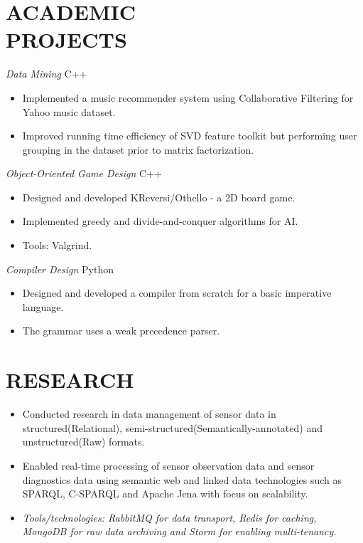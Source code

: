 \documentclass[line,margin]{res}
\begin{document}
\begin{resume}
 
\section{ACADEMIC \\ PROJECTS}  {\sl Data Mining} \hfill        C++
                 \begin{itemize}  \itemsep -2pt %
                 \item Implemented a music recommender system using Collaborative Filtering for Yahoo music dataset.
                 \item Improved running time efficiency of SVD feature toolkit but performing user grouping in the dataset prior to matrix factorization.
                 \end{itemize} 
                {\sl Object-Oriented Game Design}  \hfill        C++
                  \begin{itemize} \itemsep -2pt
                   \item Designed and developed KReversi/Othello - a 2D board game.
                   \item Implemented greedy and divide-and-conquer algorithms for AI.
                   \item Tools: Valgrind.
                   \end{itemize} 
                   {\sl Compiler Design}  \hfill        Python
                  \begin{itemize} \itemsep -2pt
                   \item Designed and developed a compiler from scratch for a basic imperative language.
                   \item The grammar uses a weak precedence parser.       
                   \end{itemize}
                   
\section{RESEARCH}	\begin{itemize}  \itemsep -2pt
					\item Conducted research in data management of sensor data in structured(Relational), semi-structured(Semantically-annotated) and unstructured(Raw) formats. 
					\item Enabled real-time processing of sensor observation data and sensor diagnostics data using semantic web and linked data technologies such as SPARQL, C-SPARQL and Apache Jena with focus on scalability.
					\item \emph{Tools/technologies: RabbitMQ for data transport, Redis for caching, MongoDB for raw data archiving and Storm for enabling multi-tenancy.}
\end{itemize}


\end{resume}
\end{document}
